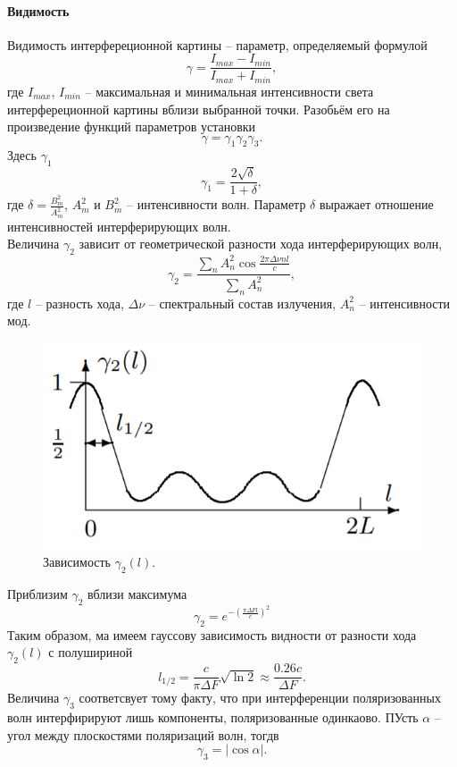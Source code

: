 \documentclass[a4paper,12pt]{article}
\begin{document}
\paragraph*{Видимость}
Видимость интерфереционной картины -- параметр, определяемый формулой
\begin{equation}
\gamma = \dfrac{I_{max} - I_{min}}{I_{max} + I_{min}},
\end{equation}
где $I_{max}$, $I_{min}$ -- максимальная и минимальная интенсивности света интерфереционной картины вблизи выбранной точки. Разобьём его на произведение функций параметров установки
$$
\gamma = \gamma_1 \gamma_2 \gamma_3.
$$
Здесь $\gamma_1$
\begin{equation}
\gamma_1 = \dfrac{2\sqrt{\delta}}{1+\delta},
\end{equation}
где $\delta = \frac{B_m^2}{A_m^2}$, $A_m^2$ и $B_m^2$ -- интенсивности волн. Параметр $\delta$ выражает отношение интенсивностей интерферирующих волн.\\
Величина $\gamma_2$ зависит от геометрической разности хода интерферирующих волн,
$$
\gamma_2 = \dfrac{\sum\limits_n A^2_n \cos \frac{2\pi \Delta \nu n l}{c}}{\sum\limits_n A_n^2},
$$
где $l$ -- разность хода, $\Delta \nu$ -- спектральный состав излучения, $A_n^2$ -- интенсивности мод. 
\begin{figure}[H]
\begin{center}
\includegraphics[scale=0.6]{1.png}
\end{center}
\caption{Зависимость $\gamma_2(l)$.}
\end{figure}
\noindent Приблизим $\gamma_2$ вблизи максимума
$$
\gamma_2 = e^{-\left(\frac{\pi \Delta F l}{c}\right)^2}
$$
Таким образом, ма имеем гауссову зависимость видности от разности хода $\gamma_2(l)$ с полушириной 
\begin{equation}
l_{1/2} = \dfrac{c}{\pi \Delta F}\sqrt{\ln 2} \approx \dfrac{0.26 c}{\Delta F}.
\end{equation}
Величина $\gamma_3$ соответсвует тому факту, что при интерференции поляризованных волн интерфирируют лишь компоненты, поляризованные одинкаово. ПУсть $\alpha$ -- угол между плоскостями поляризаций волн, тогдв
\begin{equation}
\gamma_3 = |\cos \alpha|.
\end{equation}
\end{document}
